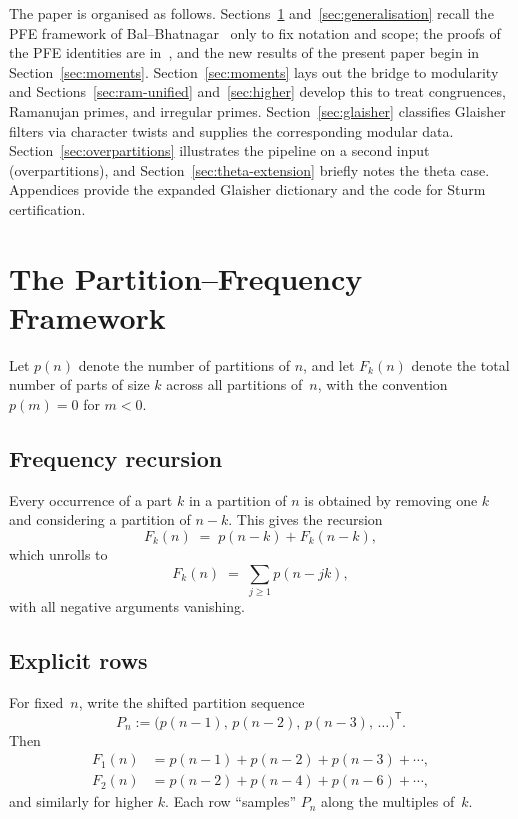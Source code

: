 \documentclass[11pt]{article}
\theoremstyle{definition}
\theoremstyle{remark}
\begin{document}
The paper is organised as follows.
Sections~\ref{sec:framework} and~\ref{sec:generalisation} recall the PFE framework
of Bal--Bhatnagar~\cite{BB21} only to fix notation and scope; the proofs of the
PFE identities are in~\cite{BB21}, and the new results of the present paper begin
in Section~\ref{sec:moments}.
Section~\ref{sec:moments} lays out the bridge to modularity and
Sections~\ref{sec:ram-unified} and~\ref{sec:higher} develop this to treat
congruences, Ramanujan primes, and irregular primes.
Section~\ref{sec:glaisher} classifies Glaisher filters via character twists and
supplies the corresponding modular data.
Section~\ref{sec:overpartitions} illustrates the pipeline on a second input
(overpartitions), and Section~\ref{sec:theta-extension} briefly notes the theta
case.  Appendices provide the expanded Glaisher dictionary and the code for Sturm
certification.

\section{The Partition--Frequency Framework}\label{sec:framework}

Let $p(n)$ denote the number of partitions of $n$, and let $F_k(n)$ denote the
total number of parts of size $k$ across all partitions of~$n$, with the
convention $p(m)=0$ for $m<0$.

\subsection{Frequency recursion}

Every occurrence of a part $k$ in a partition of $n$ is obtained by removing
one $k$ and considering a partition of $n-k$. This gives the recursion
\[
  F_k(n) \;=\; p(n-k) + F_k(n-k),
\]
which unrolls to
\[
  F_k(n) \;=\; \sum_{j\ge1} p(n-jk),
\]
with all negative arguments vanishing.

\subsection{Explicit rows}

For fixed~$n$, write the shifted partition sequence
\[
  P_n := \bigl(p(n-1),\,p(n-2),\,p(n-3),\,\ldots\bigr)^{\mathsf T}.
\]
Then
\begin{align*}
  F_1(n) &= p(n-1)+p(n-2)+p(n-3)+\cdots, \\
  F_2(n) &= p(n-2)+p(n-4)+p(n-6)+\cdots,
\end{align*}
and similarly for higher $k$. Each row ``samples'' $P_n$ along the multiples of~$k$.
\end{document}
